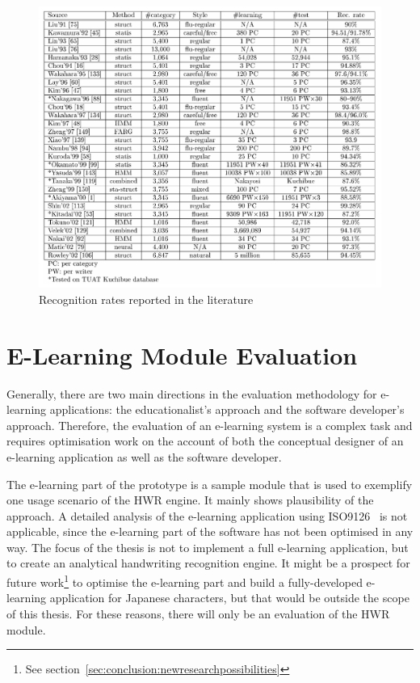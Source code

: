 \begin{figure}[htbp]
  \begin{center}
    \includegraphics[scale=0.6]{images/recognitionRatesLiuJaeger.png}
    \caption{Recognition rates reported in the literature}
    \label{fig:recognitionratesreported}
  \end{center}
\end{figure}

\section{E-Learning Module Evaluation}
\label{sec:eval:elearning}
Generally, there are two main directions in the evaluation methodology
for e-learning applications: the educationalist's approach and the 
software developer's approach.
Therefore, the evaluation of an e-learning system is a complex task
and requires optimisation work on the account of both the conceptual
designer of an e-learning application as well as the software developer.

The e-learning part of the prototype is a sample module that is used 
to exemplify one usage scenario of the HWR engine. 
It mainly shows plausibility of the approach. A detailed analysis of the
e-learning application using ISO9126~ is not applicable,
since the e-learning part of the software has not been optimised in any way.
The focus of the thesis is not to implement a full e-learning application,
but to create an analytical handwriting recognition engine.
It might be a prospect for future 
work\footnote{See section~\ref{sec:conclusion:newresearchpossibilities}}
to optimise the e-learning part and build a fully-developed e-learning
application for Japanese characters, but that would be outside the scope of 
this thesis. For these reasons, there will only be an evaluation of the
HWR module.

